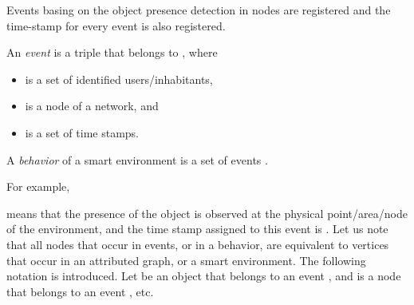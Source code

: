 \documentclass[runningheads,a4paper]{llncs}
\begin{document}
Events basing on the object presence detection in nodes are registered and
the time-stamp for every event is also registered.
\begin{definition}
\label{def:event}
An \emph{event}  is a triple that belongs to ,
where
\begin{itemize}
\item  is a set of identified users/inhabitants,
\item  is a node of a network, and
\item  is a set of time stamps.
\end{itemize}
A \emph{behavior}  of a smart environment is a set of events .
\end{definition}
For example,

means that the presence of the  object is observed at
the physical point/area/node  of the environment,
and the time stamp assigned to this event is .
Let us note that all nodes that occur in events, or in a behavior,
are equivalent to vertices that occur in an attributed graph,
or a smart environment.
The following notation is introduced.
Let  be an object  that belongs to an event ,
and  is a node  that belongs to an event , etc.
\end{document}

